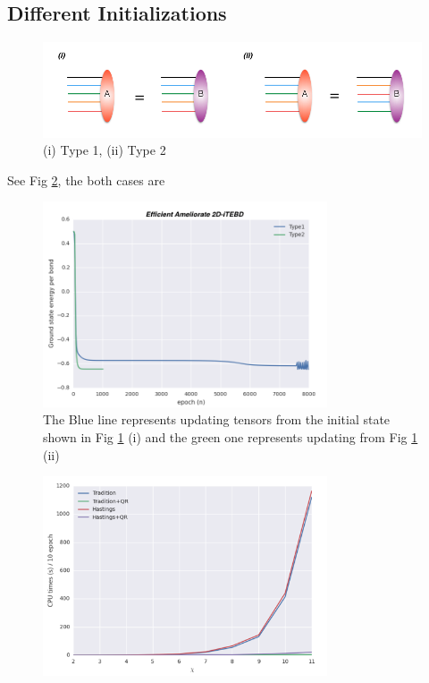 \subsection{Different Initializations}

\begin{figure}[ht]
	\centering
	\includegraphics[width=1.00\textwidth]{figures/fig322.png}
	\caption[Different methods to initialize the states]{(i) Type 1, (ii) Type 2}
	\label{fig322}
\end{figure}

See Fig \ref{fig323}, the both cases are 

\begin{figure}[ht]
	\centering
	\includegraphics[width=0.75\textwidth]{figures/fig323.png}
	\caption[Comparison the results of Heisenberg model on square lattice which are obtaining from different initial states.]{The Blue line represents updating tensors from the initial state shown in Fig \ref{fig322} (i) and the green one represents updating from Fig \ref{fig322} (ii)}
	\label{fig323}
\end{figure}

\begin{figure}[ht]
	\centering
	\includegraphics[width=0.75\textwidth]{figures/fig324.png}
	\caption[CPU times of different 2D-iTEBD with fixed trucation error]{}
	\label{fig324}
\end{figure}

